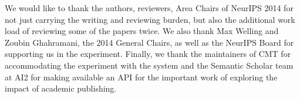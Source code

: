 \documentclass[twoside]{article}
\begin{document}
We would like to thank the authors, reviewers, Area Chairs of NeurIPS 2014 for not just carrying the writing and reviewing burden, but also the additional work load of reviewing some of the papers twice. We also thank Max Welling and Zoubin Ghahramani, the 2014 General Chairs, as well as the NeurIPS Board for supporting us in the experiment. Finally, we thank the maintainers of CMT for accommodating the experiment with the system and the Semantic Scholar team at AI2 for making available an API for the important work of exploring the impact of academic publishing.



\appendix

\end{document}
